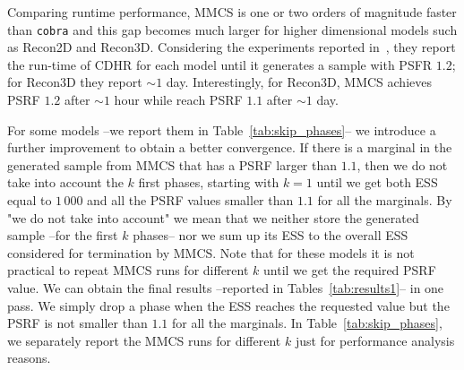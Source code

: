    Comparing runtime performance,  MMCS is one or two orders of magnitude faster than \texttt{cobra} and this gap becomes much larger for higher dimensional models such as Recon2D and Recon3D. 
   Considering the experiments reported in~\cite{jadebeck2020hops}, they report the run-time of CDHR for each model until it generates a sample with PSFR $1.2$; for Recon3D they report $\sim 1$ day. 
   Interestingly, for Recon3D, MMCS achieves PSRF $1.2$ after $\sim 1$ hour while reach PSRF $1.1$ after $\sim 1$ day. 

   For some models --we report them in Table~\ref{tab:skip_phases}-- we introduce a further improvement to obtain a better convergence. If there is a marginal in
   the generated sample from MMCS that has a PSRF larger than $1.1$, then we do not take into account the $k$ first phases, starting with $k=1$ until we get
   both ESS equal to $1\, 000$ and all the PSRF values smaller than $1.1$ for all the marginals. By "we do not take into account" we mean that  we neither store the generated sample --for the first $k$ phases-- nor we sum up its ESS to the
   overall ESS considered for termination by MMCS. Note that for these models it is not practical to repeat MMCS runs for different $k$ until we get the required PSRF value. We can obtain the final results --reported in
   Tables~\ref{tab:results1}-- in one pass. We simply drop a phase when the ESS
   reaches the requested value but the PSRF is not smaller than $1.1$ for all the
   marginals. In Table~\ref{tab:skip_phases}, we separately report the MMCS runs for different $k$ just for performance analysis reasons.



